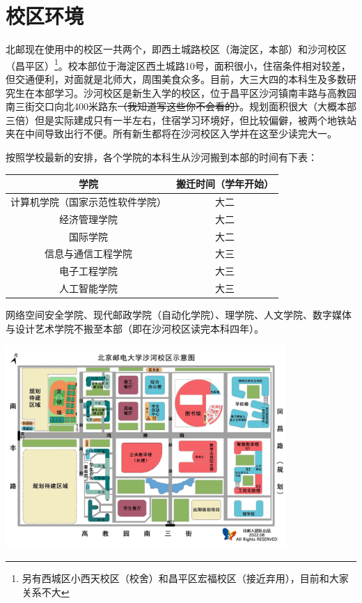 \section{校区环境}

北邮现在使用中的校区一共两个，即西土城路校区（海淀区，本部）和沙河校区（昌平区）\footnote{另有西城区小西天校区（校舍）和昌平区宏福校区（接近弃用），目前和大家关系不大}。校本部位于海淀区西土城路10号，面积很小，住宿条件相对较差，但交通便利，对面就是北师大，周围美食众多。目前，大三大四的本科生及多数研究生在本部学习。沙河校区是新生入学的校区，位于昌平区沙河镇南丰路{\small{}与高教园南三街交口向北400米路东\sout{（我知道写这些你不会看的）}}。规划面积很大（大概本部三倍）但是实际建成只有一半左右，住宿学习环境好，但比较偏僻，被两个地铁站夹在中间导致出行不便。所有新生都将在沙河校区入学并在这至少读完大一。

按照学校最新的安排，各个学院的本科生从沙河搬到本部的时间有下表：

\begin{tabular}{cc}
    \toprule
    学院 & 搬迁时间（学年开始） \\
    \midrule
    计算机学院（国家示范性软件学院） & 大二 \\
    经济管理学院 & 大二 \\
    国际学院 & 大二\\
    信息与通信工程学院 & 大三 \\
    电子工程学院 & 大三 \\
    人工智能学院 & 大三 \\
    \bottomrule
\end{tabular}

网络空间安全学院、现代邮政学院（自动化学院）、理学院、人文学院、数字媒体与设计艺术学院不搬至本部（即在沙河校区读完本科四年）。

\begin{center}
    \includegraphics[width=0.80\textwidth]{images/shahe-map.jpg}
\end{center}

